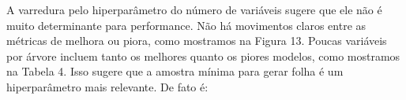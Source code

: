 \begin{figure}[H]
    \centering
    
\end{figure}

A varredura pelo hiperparâmetro do número de variáveis sugere que ele não é muito determinante para performance. Não há movimentos claros entre as métricas de melhora ou piora, como mostramos na Figura 13. Poucas variáveis por árvore incluem tanto os melhores quanto os piores modelos, como mostramos na Tabela 4. Isso sugere que a amostra mínima para gerar folha é um hiperparâmetro mais relevante. De fato é:


\begin{figure}[H]
    \centering
\end{figure}

